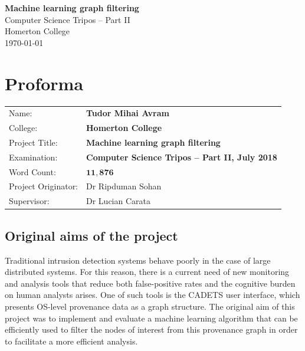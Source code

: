 \documentclass[12pt,a4paper,twoside,openright]{report}
\begin{document}




\pagestyle{empty}


\vspace*{60mm}
\begin{center}
	\Huge
	\textbf{Machine learning graph filtering} \\[5mm]
	Computer Science Tripos -- Part II \\[5mm]
	Homerton College \\[5mm]
	\today  %
\end{center}


\pagestyle{plain}

\chapter*{Proforma}

{\large
	\begin{tabular}{ll}
		Name:               & \bf Tudor Mihai Avram                     \\
		College:            & \bf Homerton College                    \\
		Project Title:      & \bf Machine learning graph filtering \\
		Examination:        & \bf Computer Science Tripos -- Part II, July 2018  \\
		Word Count:         & \bf $\mathbf{11, 876}$\footnotemark[1] \\
		Project Originator: & Dr Ripduman Sohan                   \\
		Supervisor:         & Dr Lucian Carata                    \\ 
	\end{tabular}
}


\section*{Original aims of the project}
Traditional intrusion detection systems behave poorly in the case of large distributed systems. For this reason, there is a current need of new monitoring and analysis tools that reduce both false-positive rates and the cognitive burden on human analysts arises. One of such tools is the CADETS user interface, which presents OS-level provenance data as a graph structure. The original aim of this project was to implement and evaluate a machine learning algorithm that can be efficiently used to filter the nodes of interest from this provenance graph in order to facilitate a more efficient analysis.
\end{document}
